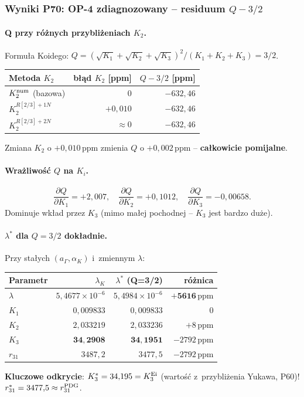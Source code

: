 \subsubsection{Wyniki P70: OP-4 zdiagnozowany -- residuum $Q-3/2$}
\label{app:F-P70}

\paragraph{Q przy r\'o\.znych przybli\.zeniach $K_2$.}
Formu\l{}a Koidego: $Q = (\sqrt{K_1}+\sqrt{K_2}+\sqrt{K_3})^2/(K_1+K_2+K_3) = 3/2$.
\begin{center}
\begin{tabular}{l|r|r}
\hline
Metoda $K_2$ & b\l{}\k{a}d $K_2$ [ppm] & $Q - 3/2$ [ppm] \\
\hline
$K_2^{\rm num}$ (bazowa) & $0$ & $-632{,}46$ \\
$K_2^{R[2/3]+1N}$ & $+0{,}010$ & $-632{,}46$ \\
$K_2^{R[2/3]+2N}$ & $\approx 0$ & $-632{,}46$ \\
\hline
\end{tabular}
\end{center}
Zmiana $K_2$ o $+0{,}010\,\mathrm{ppm}$ zmienia $Q$ o $+0{,}002\,\mathrm{ppm}$ -- \textbf{ca\l{}kowicie pomijalne}.

\paragraph{Wra\.zliwo\'s\'c $Q$ na $K_i$.}
\[
  \frac{\partial Q}{\partial K_1} = +2{,}007, \quad
  \frac{\partial Q}{\partial K_2} = +0{,}1012, \quad
  \frac{\partial Q}{\partial K_3} = -0{,}00658.
\]
Dominuje wk\l{}ad przez $K_3$ (mimo ma\l{}ej pochodnej -- $K_3$ jest bardzo du\.ze).

\paragraph{$\lambda^*$ dla $Q=3/2$ dok\l{}adnie.}
Przy sta\l{}ych $(a_\Gamma,\alpha_K)$ i~zmiennym $\lambda$:
\begin{center}
\begin{tabular}{l|r|r|r}
\hline
Parametr & $\lambda_K$ & $\lambda^*$ (Q=3/2) & r\'o\.znica \\
\hline
$\lambda$ & $5{,}4677\times10^{-6}$ & $5{,}4984\times10^{-6}$ & $\mathbf{+5616\,\mathrm{ppm}}$ \\
$K_1$ & $0{,}009833$ & $0{,}009833$ & $0$ \\
$K_2$ & $2{,}033219$ & $2{,}033236$ & $+8\,\mathrm{ppm}$ \\
$K_3$ & $\mathbf{34{,}2908}$ & $\mathbf{34{,}1951}$ & $-2792\,\mathrm{ppm}$ \\
$r_{31}$ & $3487{,}2$ & $3477{,}5$ & $-2792\,\mathrm{ppm}$ \\
\hline
\end{tabular}
\end{center}
\textbf{Kluczowe odkrycie}: $K_3^* = 34{,}195 = K_3^{\rm Ei}$ (warto\'s\'c z~przybli\.zenia Yukawa, P60)!
$r_{31}^* = 3477{,}5 \approx r_{31}^{\rm PDG}$.

